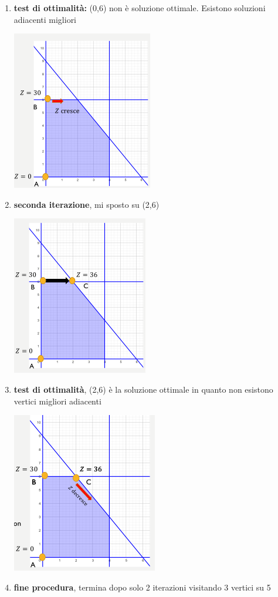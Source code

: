 \message{ !name(ro.tex)}\documentclass[a4paper,12pt, oneside]{book}
\begin{document}
\begin{enumerate}
\begin{center}
  \end{center}
  \item \textbf{test di ottimalità:} (0,6) non è soluzione ottimale.
  Esistono soluzioni adiacenti migliori
  \begin{center}
    \includegraphics[scale = 0.8]{img/simp11.png}
  \end{center}
  \item \textbf{seconda iterazione}, mi sposto su (2,6)
  \begin{center}
    \includegraphics[scale = 0.8]{img/simp12.png}
  \end{center}
  \item \textbf{test di ottimalità}, (2,6) è la soluzione ottimale in
  quanto non esistono vertici migliori adiacenti
  \begin{center}
    \includegraphics[scale = 0.8]{img/simp13.png}
  \end{center}
  \item \textbf{fine procedura}, termina dopo solo 2 iterazioni
  visitando 3 vertici su 5
\end{enumerate}
\end{document}

